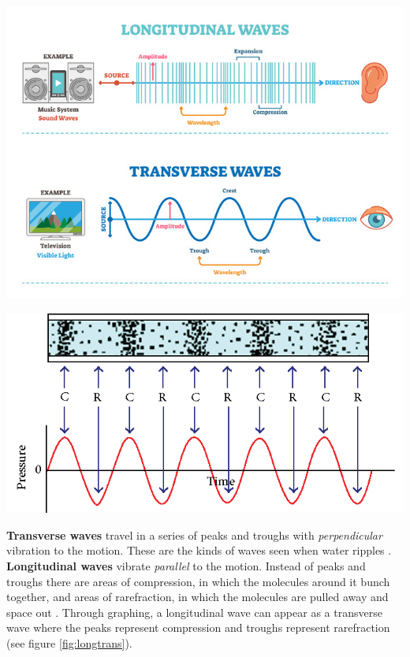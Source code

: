 \documentclass[12pt]{article}
\begin{document}
\begin{minipage}{.47\textwidth}
    \captionsetup{hypcap=false}
    \includegraphics[width=\linewidth]{wavetype.jpg}
    \label{fig:wavetype}
\end{minipage}
\hfill
\begin{minipage}{.51\textwidth}
    \captionsetup{hypcap=false}
    \includegraphics[width=\linewidth]{longtrans.png}
    \label{fig:longtrans}
\end{minipage}

\textbf{Transverse waves} travel in a series of peaks and troughs with \textit{perpendicular} vibration to the motion. These are the kinds of waves seen when water ripples \cite{waveffden}.
\textbf{Longitudinal waves} vibrate \textit{parallel} to the motion. Instead of peaks and troughs there are areas of compression, in which the molecules around it bunch together, and
areas of rarefraction, in which the molecules are pulled away and space out \cite{waveffden,studywave,acousticsound}.
Through graphing, a longitudinal wave can appear as a transverse wave where the peaks represent compression and troughs represent rarefraction (see figure \ref{fig:longtrans}).
\end{document}
